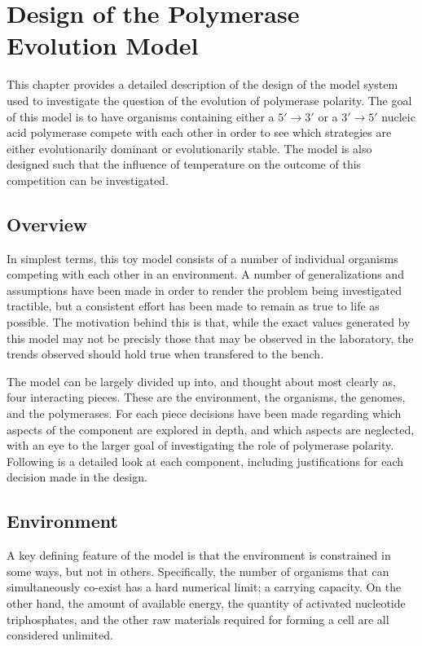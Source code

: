 \chapter{Design of the Polymerase Evolution Model} %
\label{cha:design_of_the_polymerase_evolution_model}
This chapter provides a detailed description of the design of the model system used to investigate the question of the evolution of polymerase polarity. The goal of this model is to have organisms containing either a $5'\to3'$ or a $3'\to5'$ nucleic acid polymerase compete with each other in order to see which strategies are either evolutionarily dominant or evolutionarily stable. The model is also designed such that the influence of temperature on the outcome of this competition can be investigated.

\section*{Overview} %
\label{sec:overview}
In simplest terms, this toy model consists of a number of individual organisms competing with each other in an environment. A number of generalizations and assumptions have been made in order to render the problem being investigated tractible, but a consistent effort has been made to remain as true to life as possible. The motivation behind this is that, while the exact values generated by this model may not be precisly those that may be observed in the laboratory, the trends observed should hold true when transfered to the bench.

The model can be largely divided up into, and thought about most clearly as, four interacting pieces. These are the environment, the organisms, the genomes, and the polymerases. For each piece decisions have been made regarding which aspects of the component are explored in depth, and which aspects are neglected, with an eye to the larger goal of investigating the role of polymerase polarity. Following is a detailed look at each component, including justifications for each decision made in the design.

\section*{Environment} %
\label{sec:environment}
A key defining feature of the model is that the environment is constrained in some ways, but not in others. Specifically, the number of organisms that can simultaneously co-exist has a hard numerical limit; a carrying capacity. On the other hand, the amount of available energy, the quantity of activated nucleotide triphosphates, and the other raw materials required for forming a cell are all considered unlimited.

